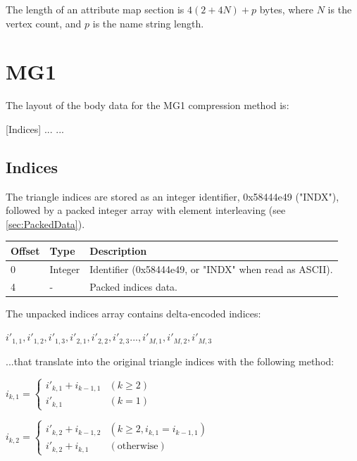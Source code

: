 The length of an attribute map section is $4(2+4N)+p$ bytes, where $N$ is the vertex
count, and $p$ is the name string length.


\section{MG1}
The layout of the body data for the MG1 compression method is:

[Indices]\newline
[Vertices]\newline
[Normals]\newline
[UV map 0]\newline
[UV map 1]\newline
...\newline
[UV map N]\newline
...

\subsection{Indices}
\label{sec:MG1Indices}
The triangle indices are stored as an integer identifier, 0x58444e49 ("INDX"),
followed by a packed integer array with element interleaving (see
\ref{sec:PackedData}).

\begin{tabular}{|l|l|l|}\hline
\textbf{Offset} &  \textbf{Type} & \textbf{Description}\\ \hline
0 & Integer & Identifier (0x58444e49, or "INDX" when read as ASCII).\\ \hline
4 & - & Packed indices data.\\ \hline
\end{tabular}

The unpacked indices array contains delta-encoded indices:

$i'_{1,1}, i'_{1,2}, i'_{1,3}, i'_{2,1}, i'_{2,2}, i'_{2,3} ..., i'_{M,1}, i'_{M,2}, i'_{M,3}$

...that translate into the original triangle indices with the following method:

$i_{k,1} = \begin{cases}
i'_{k,1} + i_{k-1,1}  & (k \geq 2) \\
i'_{k,1} & (k = 1)
\end{cases}$

$i_{k,2} = \begin{cases}
i'_{k,2} + i_{k-1,2}  & (k \geq 2, i_{k,1} = i_{k-1,1}) \\
i'_{k,2} + i_{k,1} &  (\text{otherwise})
\end{cases}$

